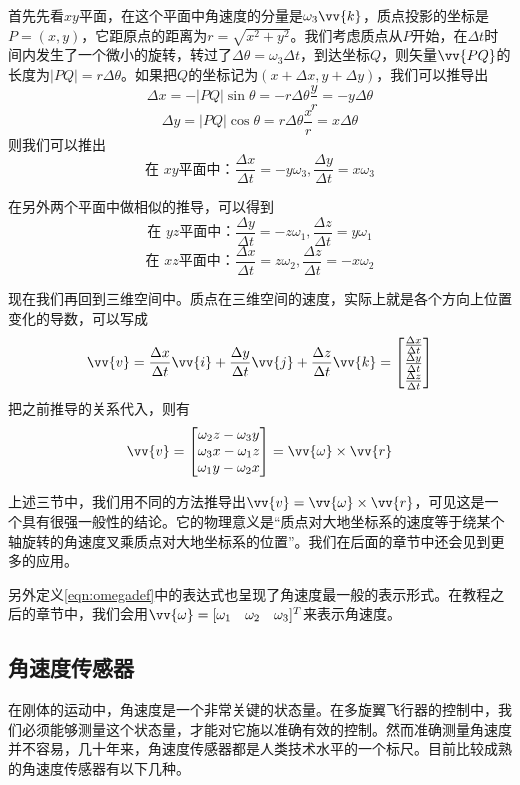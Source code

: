 \documentclass[11pt]{article}
\begin{document}
首先先看$xy$平面，在这个平面中角速度的分量是$\omega_3\vv{k}$，质点投影的坐标是$P=(x,y)$，它距原点的距离为$r = \sqrt{x^2+y^2}$。我们考虑质点从$P$开始，在$\Delta t$时间内发生了一个微小的旋转，转过了$\Delta\theta = \omega_3\Delta t$，到达坐标$Q$，则矢量$\vv{PQ}$的长度为$|PQ| = r\Delta\theta$。如果把$Q$的坐标记为$(x+\Delta x, y + \Delta y)$，我们可以推导出
$$
\Delta x = - |PQ|\sin\theta = - r\Delta\theta \frac{y}{r} = -y \Delta\theta
$$
$$
\Delta y =  |PQ|\cos\theta =  r\Delta\theta \frac{x}{r} = x \Delta\theta
$$
则我们可以推出
$$
\text{在 $xy$平面中：} \frac{\Delta x}{\Delta t} = -y \omega_3 ,  \frac{\Delta y}{\Delta t} = x \omega_3
$$

在另外两个平面中做相似的推导，可以得到
$$
\text{在 $yz$平面中：} \frac{\Delta y}{\Delta t} = -z \omega_1 ,  \frac{\Delta z}{\Delta t} = y \omega_1
$$
$$
\text{在 $xz$平面中：} \frac{\Delta x}{\Delta t} = z \omega_2 ,  \frac{\Delta z}{\Delta t} = -x \omega_2
$$

现在我们再回到三维空间中。质点在三维空间的速度，实际上就是各个方向上位置变化的导数，可以写成
$$
\vv{v} = \frac{\Delta x}{\Delta t} \vv{i} + \frac{\Delta y}{\Delta t} \vv{j} + \frac{\Delta z}{\Delta t} \vv{k} =
\begin{bmatrix}
\frac{\Delta x}{\Delta t} \\
\frac{\Delta y}{\Delta t} \\
\frac{\Delta z}{\Delta t} 
\end{bmatrix}
$$
把之前推导的关系代入，则有
$$
\vv{v} = \begin{bmatrix}
\omega_2z - \omega_3y \\
\omega_3x - \omega_1z \\
\omega_1y - \omega_2x 
\end{bmatrix}
= \vv{\omega} \times \vv{r}
$$

上述三节中，我们用不同的方法推导出$\vv{v} = \vv{\omega} \times \vv{r}$，可见这是一个具有很强一般性的结论。它的物理意义是“质点对大地坐标系的速度等于绕某个轴旋转的角速度叉乘质点对大地坐标系的位置”。我们在后面的章节中还会见到更多的应用。

另外定义\ref{eqn:omegadef}中的表达式也呈现了角速度最一般的表示形式。在教程之后的章节中，我们会用$\vv{\omega} = [\omega_1\ \ \  \omega_2\ \ \  \omega_3]^T$来表示角速度。

\subsection{角速度传感器}
在刚体的运动中，角速度是一个非常关键的状态量。在多旋翼飞行器的控制中，我们必须能够测量这个状态量，才能对它施以准确有效的控制。然而准确测量角速度并不容易，几十年来，角速度传感器都是人类技术水平的一个标尺。目前比较成熟的角速度传感器有以下几种。
\end{document}
